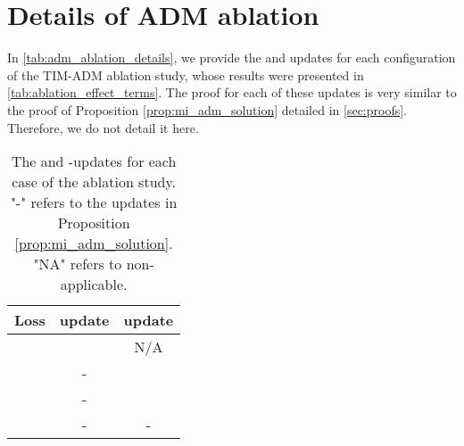 \documentclass{article}
\begin{document}
\section{Details of ADM ablation}\label{sec:details_adm_ablation}

In \autoref{tab:adm_ablation_details}, we provide the  and  updates for each configuration of the TIM-ADM ablation study, whose results were presented in \autoref{tab:ablation_effect_terms}. The proof for each of these updates is very similar to the proof of Proposition \ref{prop:mi_adm_solution} detailed in \autoref{sec:proofs}. Therefore, we do not detail it here.  

\begin{table}[H]
    \centering
    \begin{tabular}{ccc}
         \textbf{Loss} &  \textbf{update} &  \textbf{update} \\
         \toprule
          &  & N/A \\
         \midrule
 & - &  \\
         \midrule
          & - &  \\
         \midrule
          & - & - \\
         \bottomrule
    \end{tabular}
    \caption{The  and -updates for each case of the ablation study. "-" refers to the updates in Proposition \ref{prop:mi_adm_solution}. "NA" refers to non-applicable.}
    \label{tab:adm_ablation_details}
\end{table}



%
 
\end{document}
